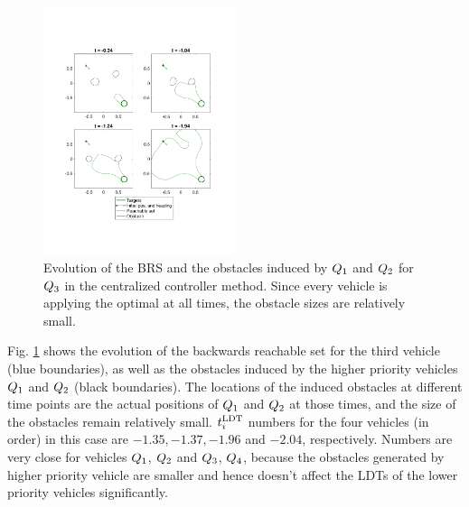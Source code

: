 \begin{figure}[h]
  \centering
  \includegraphics[width=0.5\textwidth]{"fig/cc_rs3"}
  \caption{Evolution of the BRS and the obstacles induced by $Q_1$ and $Q_2$ for $Q_3$ in the centralized controller method. Since every vehicle is applying the optimal at all times, the obstacle sizes are relatively small.}
  \label{fig:cc_rs3}
\end{figure}

Fig. \ref{fig:cc_rs3} shows the evolution of the backwards reachable set for the third vehicle (blue boundaries), as well as the obstacles induced by the higher priority vehicles $Q_1$ and $Q_2$ (black boundaries). The locations of the induced obstacles at different time points are the actual positions of $Q_1$ and $Q_2$ at those times, and the size of the obstacles remain relatively small. $t^\text{LDT}_i$ numbers for the four vehicles (in order) in this case are $-1.35, -1.37, -1.96$ and $-2.04$, respectively. Numbers are very close for vehicles $Q_1$, $Q_2$ and $Q_3$, $Q_4$, because the obstacles generated by higher priority vehicle are smaller and hence doesn't affect the LDTs of the lower priority vehicles significantly. 

